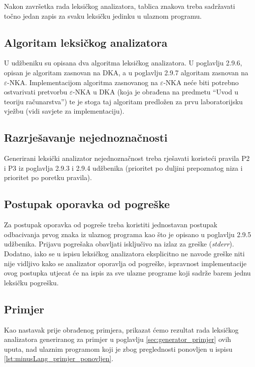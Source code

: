 \documentclass[times, 12pt, utf8]{book}
\begin{document}
Nakon završetka rada leksičkog analizatora, tablica znakova treba sadržavati točno jedan zapis za svaku leksičku jedinku u ulaznom programu.

\subsection{Algoritam leksičkog analizatora}
U udžbeniku su opisana dva algoritma leksičkog analizatora.
U poglavlju 2.9.6, opisan je algoritam zasnovan na DKA, a u poglavlju 2.9.7 algoritam zasnovan na \(\varepsilon\)-NKA.
Implementacijom algoritma zasnovanog na \(\varepsilon\)-NKA neće biti potrebno ostvarivati pretvorbu \(\varepsilon\)-NKA u DKA (koja je obrađena na predmetu “Uvod u teoriju računarstva”) te je stoga taj algoritam predložen za prvu laboratorijsku vježbu (vidi savjete za implementaciju).

\subsection{Razrješavanje nejednoznačnosti}
Generirani leksički analizator nejednoznačnost treba rješavati koristeći pravila P2 i P3 iz poglavlja 2.9.3 i 2.9.4 udžbenika (prioritet po duljini prepoznatog niza i prioritet po poretku pravila).

\subsection{Postupak oporavka od pogreške}
Za postupak oporavka od pogreše treba koristiti jednostavan postupak odbacivanja prvog znaka iz ulaznog programa kao što je opisano u poglavlju 2.9.5 udžbenika.
Prijavu pogrešaka obavljati isključivo na izlaz za greške (\emph{stderr}).
Dodatno, iako se u ispisu leksičkog analizatora eksplicitno ne navode greške niti nije vidljivo kako se analizator oporavlja od pogreške, ispravnost implementacije ovog postupka utjecat će na ispis za sve ulazne programe koji sadrže barem jednu leksičku pogrešku.

\subsection{Primjer}\label{sec:leksicki_analizator_primjer}
Kao nastavak prije obrađenog primjera, prikazat ćemo rezultat rada leksičkog analizatora generiranog za primjer u poglavlju \ref{sec:generator_primjer} ovih uputa, nad ulaznim programom koji je zbog preglednosti ponovljen u ispisu \ref{lst:minusLang_primjer_ponovljen}.
\end{document}

